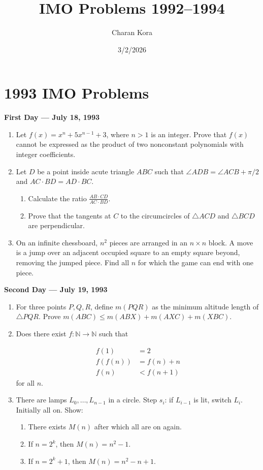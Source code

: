 \documentclass{article}
\title{\large IMO Problems 1992--1994}
\author{Charan Kora}
\date{3/2/2026}
\begin{document}
\maketitle

\section*{1993 IMO Problems}

\textbf{First Day — July 18, 1993}

\begin{enumerate}

\item Let $f(x) = x^n + 5x^{n-1} + 3$, where $n > 1$ is an integer. Prove that $f(x)$ cannot be expressed as the product of two nonconstant polynomials with integer coefficients.

\item Let $D$ be a point inside acute triangle $ABC$ such that $\angle ADB = \angle ACB + \pi/2$ and $AC \cdot BD = AD \cdot BC$.
\begin{enumerate}
\item Calculate the ratio $\frac{AB \cdot CD}{AC \cdot BD}$.
\item Prove that the tangents at $C$ to the circumcircles of $\triangle ACD$ and $\triangle BCD$ are perpendicular.
\end{enumerate}

\item On an infinite chessboard, $n^2$ pieces are arranged in an $n \times n$ block. A move is a jump over an adjacent occupied square to an empty square beyond, removing the jumped piece. Find all $n$ for which the game can end with one piece.

\end{enumerate}
\newpage
\textbf{Second Day — July 19, 1993}

\begin{enumerate}

\item For three points $P,Q,R$, define $m(PQR)$ as the minimum altitude length of $\triangle PQR$. Prove
$m(ABC) \le m(ABX) + m(AXC) + m(XBC)$.

\item Does there exist $f:\mathbb{N}\to\mathbb{N}$ such that  

\begin{align}
f(1) &= 2 \\
f(f(n)) &= f(n) + n \\
f(n) &< f(n+1)
\end{align}
for all $n$.


\item There are lamps $L_0,\dots,L_{n-1}$ in a circle. Step $s_i$: if $L_{i-1}$ is lit, switch $L_i$. Initially all on. Show:
\begin{enumerate}
\item There exists $M(n)$ after which all are on again.
\item If $n = 2^k$, then $M(n) = n^2 - 1$.
\item If $n = 2^k + 1$, then $M(n) = n^2 - n + 1$.
\end{enumerate}

\end{enumerate}
\newpage
\end{document}
